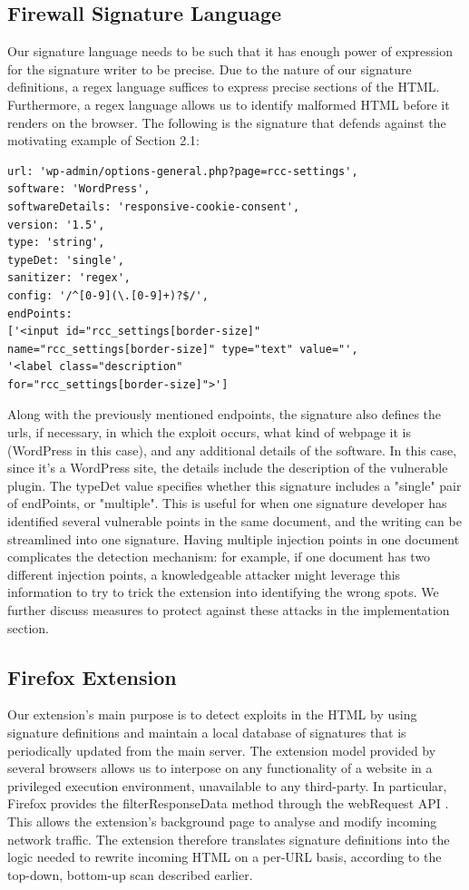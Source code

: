  \subsection{Firewall Signature Language}
 Our signature language needs to be such that it has enough power of expression for the signature writer to be precise. Due to the nature of our signature definitions, a regex language suffices to express precise sections of the HTML. Furthermore, a regex language allows us to identify malformed HTML before it renders on the browser. The following is the signature that defends against the motivating example of Section 2.1:
 \lstset{basicstyle=\small}
\begin{lstlisting}
url: 'wp-admin/options-general.php?page=rcc-settings',
software: 'WordPress',
softwareDetails: 'responsive-cookie-consent',
version: '1.5',
type: 'string',
typeDet: 'single',
sanitizer: 'regex',
config: '/^[0-9](\.[0-9]+)?$/',
endPoints: 
['<input id="rcc_settings[border-size]" 
name="rcc_settings[border-size]" type="text" value="',
'<label class="description" 
for="rcc_settings[border-size]">']
\end{lstlisting}
 
 Along with the previously mentioned endpoints, the signature also defines the urls, if necessary, in which the exploit occurs, what kind of webpage it is (WordPress in this case), and any additional details of the software. In this case, since it's a WordPress site, the details include the description of the vulnerable plugin. The typeDet value specifies whether this signature includes a "single" pair of endPoints, or "multiple". This is useful for when one signature developer has identified several vulnerable points in the same document, and the writing can be streamlined into one signature. Having multiple injection points in one document complicates the detection mechanism: for example, if one document has two different injection points, a knowledgeable attacker might leverage this information to try to trick the extension into identifying the wrong spots. We further discuss measures to protect against these attacks in the implementation section.
 
 \subsection{Firefox Extension}
Our extension's main purpose is to detect exploits in the HTML by using signature definitions and maintain a local database of signatures that is periodically updated from the main server.
The extension model provided by several browsers allows us to interpose on any functionality of a website in a privileged execution environment, unavailable to any third-party. In particular, Firefox provides the filterResponseData method through the webRequest API \cite{webRequest} . This allows the extension's background page to analyse and modify incoming network traffic. The extension therefore translates signature definitions into the logic needed to rewrite incoming HTML on a per-URL basis, according to the top-down, bottom-up scan described earlier. 

